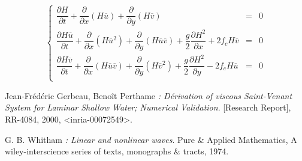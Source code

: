 \documentclass[10pt,a4paper]{amsart}
\begin{document}
\begin{equation} \label{SWE_nonvisqueux}
\left\{
\begin{array}{rcl}
\dfrac{\partial H}{\partial t} + \dfrac{\partial}{\partial x} \left( H \overline{u} \right)+ \dfrac{\partial}{\partial y} \left( H \overline{v} \right) & = & 0\\
\dfrac{\partial H \overline{u}}{\partial t} + \dfrac{\partial}{\partial x} \left( H \overline{u}^2 \right) + \dfrac{\partial}{\partial y} \left( H \overline{u} \overline{v} \right) + \dfrac{g}{2}\dfrac{\partial H^2}{\partial x} + 2 f_c H \overline{v} & = & 0\\
\dfrac{\partial H \overline{v}}{\partial t} + \dfrac{\partial}{\partial x} \left( H \overline{u} \overline{v} \right) + \dfrac{\partial}{\partial y} \left( H \overline{v}^{2} \right) + \dfrac{g}{2}\dfrac{\partial H^2}{\partial y} - 2 f_c H \overline{u} & = & 0\\
\end{array}
\right.
\end{equation}































\begin{thebibliography}{9}
        

         Jean-Frédéric Gerbeau, Benoît Perthame
         \emph{:  Dérivation of viscous Saint-Venant System for Laminar Shallow Water; Numerical Validation}.
         [Research Report],
         RR-4084,
         2000,
         <inria-00072549>.
         
         G. B. Whitham
         \emph{:  Linear and nonlinear waves}.
         Pure \& Applied Mathematics,
         A wiley-interscience series of texts, monographs \& tracts,
         1974.

		
\end{thebibliography}
\end{document}
